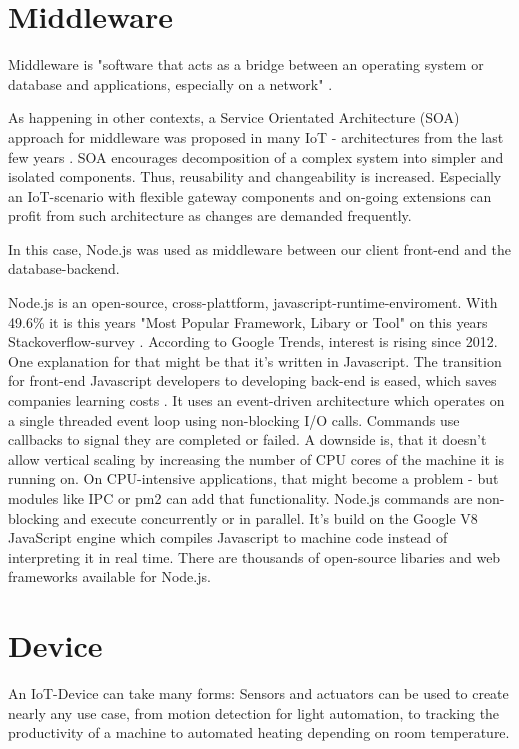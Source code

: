 \section{Middleware}
Middleware is "software that acts as a bridge between an operating system or database 
and applications, 
especially on a network" \parencite{middlewaredef}. 

As happening in other contexts, 
a Service Orientated Architecture (SOA) approach for middleware 
was proposed in many IoT - architectures from the last few years \parencite{archsurv1}. 
SOA encourages decomposition of a complex system into simpler and isolated components.
Thus, reusability and changeability is increased. 
Especially an IoT-scenario with flexible gateway components and on-going extensions can profit from such 
architecture as changes are demanded frequently.

\parencite{archsurv1}
In this case, Node.js was used as middleware between our client front-end and the database-backend.

Node.js is an open-source, cross-plattform, javascript-runtime-enviroment. 
With 49.6\% it is this years "Most Popular Framework, Libary or Tool" on this years Stackoverflow-survey \parencite{stackOverflowSurvey}.
According to Google Trends, interest is rising since 2012\parencite{gogleTrendNode}.
One explanation for that might be that it's written in Javascript. 
The transition for front-end Javascript developers to developing back-end is eased, which saves companies learning costs \parencite{nodejssavescost}.
It uses an event-driven architecture which operates on a single threaded event loop using non-blocking I/O calls.
Commands use callbacks to signal they are completed or failed. 
A downside is, that it doesn't allow vertical scaling by increasing the number of CPU cores of the machine it is running on. 
On CPU-intensive applications, that might become a problem - but modules like IPC or pm2 can add that functionality.
Node.js commands are non-blocking and execute concurrently or in parallel. 
It's build on the Google V8 JavaScript engine which compiles Javascript to machine code instead of interpreting it in real time. 
There are thousands of open-source libaries and web frameworks available for Node.js. 

\section{Device}
An IoT-Device can take many forms: 
Sensors and actuators can be used to create nearly any use case, 
from motion detection for light automation, to tracking the productivity of a machine to automated heating depending on room temperature.

